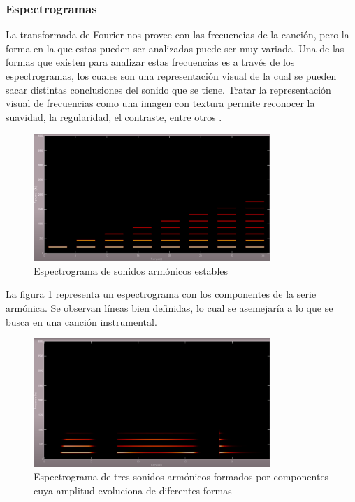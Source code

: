 \documentclass[12pt, letterpaper]{article}
\begin{document}
\subsubsection{Espectrogramas}

La transformada de Fourier nos provee con las frecuencias de la canción,
pero la forma en la que estas pueden ser analizadas puede ser muy variada.
Una de las formas que existen para analizar estas frecuencias es a través de los
espectrogramas, los cuales son una representación visual de la cual se pueden
sacar distintas conclusiones del sonido que se tiene. Tratar la representación
visual de frecuencias como una imagen con textura permite reconocer la suavidad,
la regularidad, el contraste, entre otros \cite{Costa-2011}.

\begin{figure}[H]
  \centering
  \includegraphics[width=0.8\textwidth]{espectrogramas_01.png}
  \caption{Espectrograma de sonidos armónicos estables \cite{Colomer-01}}
  \label{fig:e1}
\end{figure}

\noindent La figura \ref{fig:e1} representa un espectrograma con
los componentes de la serie armónica. Se observan líneas bien definidas,
lo cual se asemejaría a lo que se busca en una canción instrumental.

\begin{figure}[H]
  \centering
  \includegraphics[width=0.8\textwidth]{espectrogramas_02.png}
  \caption{Espectrograma de tres sonidos armónicos formados por
  componentes cuya amplitud evoluciona de diferentes formas \cite{Colomer-02}}
  \label{fig:e2}
\end{figure}
\end{document}
